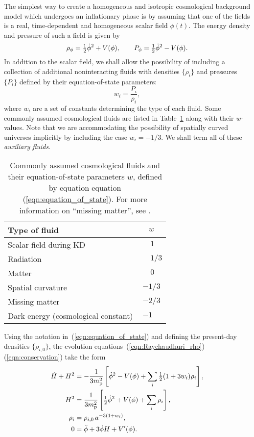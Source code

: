 The simplest way to create a homogeneous and isotropic cosmological background model which undergoes an inflationary phase is by assuming that one of the fields is a real, time-dependent and homogeneous scalar field $\phi(t)$. The energy density and pressure of such a field is given by 
%
\begin{equation}
  \rho_\phi = {\textstyle\frac{1}{2}}\dot{\phi}^2+V(\phi),
  \qquad
  P_\phi = {\textstyle\frac{1}{2}}\dot{\phi}^2-V(\phi).
  \label{eqn:rhopdef}
\end{equation}
%
In addition to the scalar field, we shall allow the possibility of including a collection of additional noninteracting fluids with densities $\{\rho_i\}$ and pressures $\{P_i\}$ defined by their equation-of-state parameters:
%
\begin{equation}
  w_i =\frac{P_i}{\rho_i},
  \label{eqn:equation_of_state}
\end{equation}
%
where ${w_i}$ are a set of constants determining the type of each fluid. Some commonly assumed cosmological fluids are listed in Table~\ref{tab:type_of_fluid} along with their $w$-values. Note that we are accommodating the possibility of spatially curved universes implicitly by including the case $w_i=-1/3$. We shall term all of these {\em auxiliary fluids}.
%
\begin{table}
  \caption{Commonly assumed cosmological fluids and their
    equation-of-state parameters $w$, defined by equation equation (\protect\ref{eqn:equation_of_state}).  For more information on ``missing matter'', see \protect\citet{vazquez_2012}\label{tab:type_of_fluid}.
  }
    \begin{tabular}{lc}
      Type of fluid & $w$ \\
      \hline
      Scalar field during KD & $ \phantom{-}1\phantom{/3} $ \\
      Radiation & $ \phantom{-}1/3 $ \\
      Matter & $ \phantom{-}0\phantom{/3} $ \\
      Spatial curvature & $ -1/3$ \\
      Missing matter & $ -2/3$ \\
      Dark energy (cosmological constant) & $ -1\phantom{/3} $ \\
    \end{tabular}
\end{table}
%

Using the notation in~(\ref{eqn:equation_of_state}) and defining the present-day densities $\{\rho_{i,0}\}$, the evolution equations~(\ref{eqn:Raychaudhuri_rho})--(\ref{eqn:conservation}) take the form 
%
\begin{align}
  \dot{H}+H^2 &= 
  -\frac{1}{3m_{\mathrm{p}}^2}\left[\dot{\phi}^2 - V(\phi) +
  \sum_i{\textstyle\frac{1}{2}}(1+3w_i)\rho_i\right] ,
  \label{eqn:Raychaudhuri_mod}
  \\
  H^2 &= 
  \frac{1}{3m_{\mathrm{p}}^2}\left[{\textstyle\frac{1}{2}}\dot{\phi}^2 + V(\phi) +
  \sum_i\rho_i\right],
  \label{eqn:Friedmann_mod} 
  \\
  \rho_i &= 
  \rho_{i,0} \,a^{-3(1+w_i)},
  \label{eqn:rho_a} 
  \\ 
  0&= 
  \ddot{\phi} +3\dot{\phi}H + V^\prime(\phi).
  \label{eqn:Klein_Gordon_mod}
\end{align}
%                                                          

